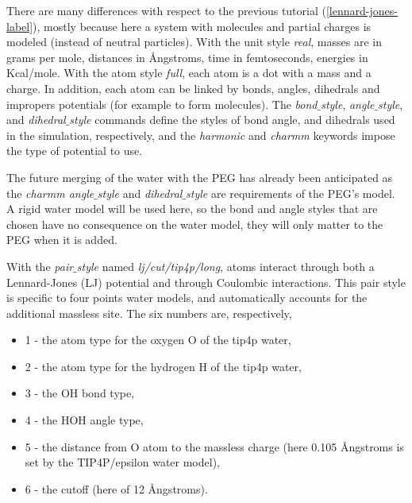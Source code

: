 \noindent There are many differences with respect to
the previous tutorial (\ref{lennard-jones-label}), mostly
because here a system with molecules and partial charges is
modeled (instead of neutral particles). With the unit style \textit{real},
masses are in grams per
mole, distances in Ångstroms, time in femtoseconds, energies
in Kcal/mole. With the atom style \textit{full}, each atom is a dot
with a mass and a charge. In addition, each atom can be
linked by bonds, angles, dihedrals and impropers potentials
(for example to form molecules). The \textit{bond$\_$style},
\textit{angle$\_$style}, and \textit{dihedral$\_$style} commands define the
styles of bond angle, and dihedrals used in the simulation,
respectively, and the \textit{harmonic} and \textit{charmm} keywords
impose the type of potential to use.

\begin{tcolorbox}[colback=mylightblue!5!white,colframe=mylightblue!75!black,title=About the use of charmm style]
The future merging of the water with the PEG
has already been anticipated as the \textit{charmm angle$\_$style}
and \textit{dihedral$\_$style} are requirements of the PEG's model.
A rigid water model will be used here, so the bond
and angle styles that are chosen have no consequence on the water model, they will
only matter to the PEG when it is added.
\end{tcolorbox}

\noindent With the \textit{pair$\_$style} named \textit{lj/cut/tip4p/long}, atoms
interact through both a Lennard-Jones (LJ) potential and
through Coulombic interactions. This pair style is specific to
four points water models, and automatically accounts for the
additional massless site. The six numbers are, respectively,
\begin{itemize}
\item  \textit{}1 -\textit{} the atom type for the oxygen O of the tip4p water,
\item  \textit{}2 -\textit{} the atom type for the hydrogen H of the tip4p water,
\item  \textit{}3 -\textit{} the OH bond type,
\item  \textit{}4 -\textit{} the HOH angle type,
\item  \textit{}5 -\textit{} the distance from O atom to the massless charge (here 0.105 Ångstroms is set by the TIP4P/epsilon water model),
\item  \textit{}6 -\textit{} the cutoff (here of 12 Ångstroms).
\end{itemize}

